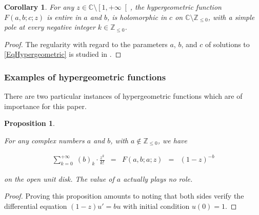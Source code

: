 \documentclass{jams-l}
\newtheorem{proposition}[theorem]{Proposition}
\newtheorem{corollary}[theorem]{Corollary}
\theoremstyle{definition}
\theoremstyle{remark}
\numberwithin{equation}{section}
\begin{document}
            \begin{corollary}
        
                For any $z \in \mathbb{C} \setminus \left[ 1, +\infty \right[$, the hypergeometric function $F \left( a, b; c; z \right)$ is entire in $a$ and $b$, is holomorphic in $c$ on $\mathbb{C} \setminus \mathbb{Z}_{\leqslant 0}$, with a simple pole at every negative integer $k \in \mathbb{Z}_{\leqslant 0}$.
        
            \end{corollary}
            
            \begin{proof}
            
                The regularity with regard to the parameters $a$, $b$, and $c$ of solutions to \eqref{EqHypergeometric} is studied in \cite[Sec. 5.3.3]{MR1429619}.
            
            \end{proof}
            
        
        \subsubsection{Examples of hypergeometric functions}
        
            There are two particular instances of hypergeometric functions which are of importance for this paper.
        
            \begin{proposition}
            \label{PropBinomialFormula}
        
                For any complex numbers $a$ and $b$, with $a \not \in \mathbb{Z}_{\leqslant 0}$, we have
            
                \[ \begin{array}{lllll}
                        \sum\limits_{k=0}^{+\infty} \; \left( b \right)_k \cdot \frac{z^k}{k!} & = & F \left( a, b; a; z \right) & = & \left( 1 - z \right)^{-b}
                    \end{array} \]
            
                \noindent on the open unit disk. The value of $a$ actually plays no role.
        
            \end{proposition}
            
            \begin{proof}
            
                Proving this proposition amounts to noting that both sides verify the differential equation $ \left( 1-z \right) u' = b u$ with initial condition $u \left(0 \right) = 1$.
            
            \end{proof}
        
\end{document}
